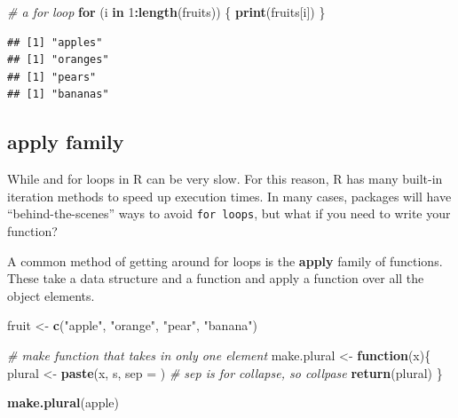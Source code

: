 \documentclass[
]{book}
\newenvironment{Shaded}{\begin{snugshade}}{\end{snugshade}}
\newcommand{\AttributeTok}[1]{\textcolor[rgb]{0.13,0.29,0.53}{#1}}
\newcommand{\CommentTok}[1]{\textcolor[rgb]{0.56,0.35,0.01}{\textit{#1}}}
\newcommand{\ControlFlowTok}[1]{\textcolor[rgb]{0.13,0.29,0.53}{\textbf{#1}}}
\newcommand{\DecValTok}[1]{\textcolor[rgb]{0.00,0.00,0.81}{#1}}
\newcommand{\FunctionTok}[1]{\textcolor[rgb]{0.13,0.29,0.53}{\textbf{#1}}}
\newcommand{\NormalTok}[1]{#1}
\newcommand{\OtherTok}[1]{\textcolor[rgb]{0.56,0.35,0.01}{#1}}
\newcommand{\SpecialCharTok}[1]{\textcolor[rgb]{0.81,0.36,0.00}{\textbf{#1}}}
\newcommand{\StringTok}[1]{\textcolor[rgb]{0.31,0.60,0.02}{#1}}
\begin{document}
\begin{Shaded}
\begin{Highlighting}[]
\CommentTok{\# a for loop}
\ControlFlowTok{for}\NormalTok{ (i }\ControlFlowTok{in} \DecValTok{1}\SpecialCharTok{:}\FunctionTok{length}\NormalTok{(fruits)) \{}
  \FunctionTok{print}\NormalTok{(fruits[i])}
\NormalTok{\}}
\end{Highlighting}
\end{Shaded}

\begin{verbatim}
## [1] "apples"
## [1] "oranges"
## [1] "pears"
## [1] "bananas"
\end{verbatim}

\subsection{apply family}\label{apply-family}

While and for loops in R can be very slow. For this reason, R has many built-in iteration methods to speed up execution times. In many cases, packages will have ``behind-the-scenes'' ways to avoid \texttt{for\ loops}, but what if you need to write your function?

A common method of getting around for loops is the \textbf{apply} family of functions. These take a data structure and a function and apply a function over all the object elements.

\begin{Shaded}
\begin{Highlighting}[]
\NormalTok{fruit }\OtherTok{\textless{}{-}} \FunctionTok{c}\NormalTok{(}\StringTok{"apple"}\NormalTok{, }\StringTok{"orange"}\NormalTok{, }\StringTok{"pear"}\NormalTok{, }\StringTok{"banana"}\NormalTok{)}

\CommentTok{\# make function that takes in only one element}
\NormalTok{make.plural }\OtherTok{\textless{}{-}} \ControlFlowTok{function}\NormalTok{(x)\{}
\NormalTok{   plural }\OtherTok{\textless{}{-}} \FunctionTok{paste}\NormalTok{(x, }\StringTok{\textquotesingle{}s\textquotesingle{}}\NormalTok{, }\AttributeTok{sep =} \StringTok{\textquotesingle{}\textquotesingle{}}\NormalTok{) }\CommentTok{\# sep is for collapse, so collpase \textquotesingle{}\textquotesingle{}}
   \FunctionTok{return}\NormalTok{(plural)}
\NormalTok{\}}

\FunctionTok{make.plural}\NormalTok{(}\StringTok{\textquotesingle{}apple\textquotesingle{}}\NormalTok{)}
\end{Highlighting}
\end{Shaded}
\end{document}
